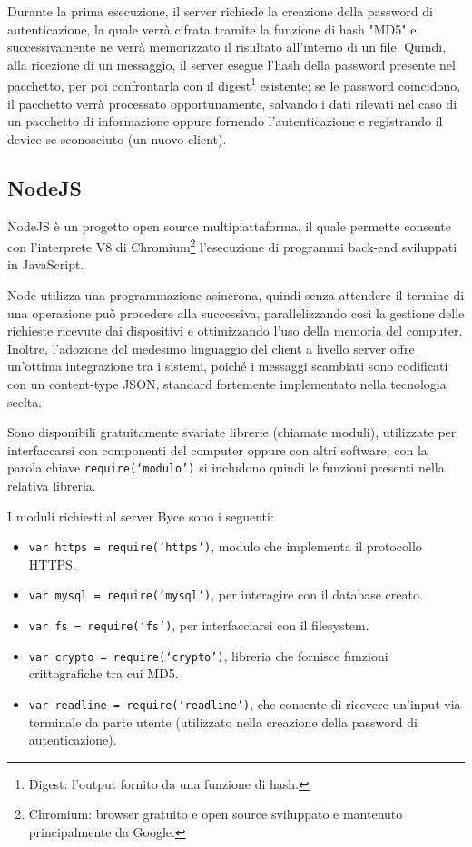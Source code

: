 \documentclass[target=bach]{thud}
\begin{document}
        Durante la prima esecuzione, il server richiede la creazione della password di autenticazione, la quale verrà cifrata tramite la funzione di hash "MD5" e successivamente ne verrà memorizzato il risultato all'interno di un file.
        Quindi, alla ricezione di un messaggio, il server esegue l'hash della password presente nel pacchetto, per poi confrontarla con il digest\footnote[13]{Digest: l'output fornito da una funzione di hash.} esistente; se le password coincidono, il pacchetto verrà processato opportunamente, salvando i dati rilevati nel caso di un pacchetto di informazione oppure fornendo l'autenticazione e registrando il device se sconosciuto (un nuovo client).


            \subsection{NodeJS}
                NodeJS è un progetto open source multipiattaforma, il quale permette consente con l'interprete V8 di Chromium\footnote[14]{Chromium: browser gratuito e open source sviluppato e mantenuto principalmente da Google.} l'esecuzione di programmi back-end sviluppati in JavaScript.

                Node utilizza una programmazione asincrona, quindi senza attendere il termine di una operazione può procedere alla successiva, parallelizzando così la gestione delle richieste ricevute dai dispositivi e ottimizzando l'uso della memoria del computer.
                Inoltre, l'adozione del medesimo linguaggio del client a livello server offre un'ottima integrazione tra i sistemi, poiché i messaggi scambiati sono codificati con un content-type JSON, standard fortemente implementato nella tecnologia scelta.

                Sono disponibili gratuitamente svariate librerie (chiamate moduli), utilizzate per interfaccarsi con componenti del computer oppure con altri software; con la parola chiave \texttt{require(`modulo')} si includono quindi le funzioni presenti nella relativa libreria.

                I moduli richiesti al server Byce sono i seguenti:
                \begin{itemize}
                    \setlength{\itemsep}{1pt}
                    \item \texttt{var https = require(`https')}, modulo che implementa il protocollo HTTPS.
                    \item \texttt{var mysql = require(`mysql')}, per interagire con il database creato.
                    \item \texttt{var fs = require(`fs')}, per interfacciarsi con il filesystem.
                    \item \texttt{var crypto = require(`crypto')}, libreria che fornisce funzioni crittografiche tra cui MD5.
                    \item \texttt{var readline = require(`readline')}, che consente di ricevere un'input via terminale da parte utente (utilizzato nella creazione della password di autenticazione).
                \end{itemize}
\end{document}
